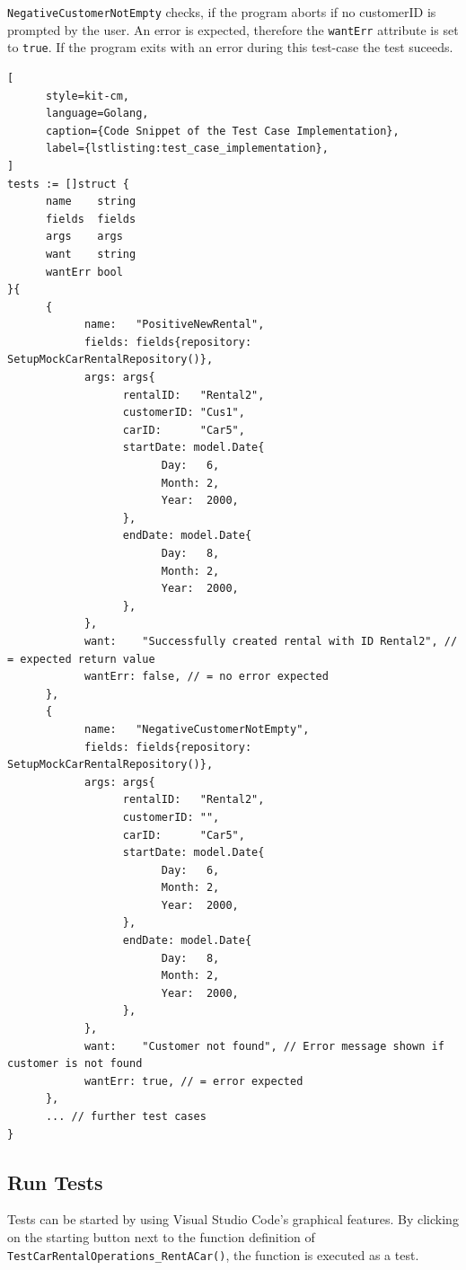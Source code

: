 \texttt{NegativeCustomerNotEmpty} checks, if the program aborts if no customerID is prompted by the user.
An error is expected, therefore the \texttt{wantErr} attribute is set to \texttt{true}.
If the program exits with an error during this test-case the test suceeds.

\begin{lstlisting}[
      style=kit-cm,
      language=Golang,
      caption={Code Snippet of the Test Case Implementation},
      label={lstlisting:test_case_implementation},
]
tests := []struct {
      name    string
      fields  fields
      args    args
      want    string
      wantErr bool
}{
      {
            name:   "PositiveNewRental",
            fields: fields{repository: SetupMockCarRentalRepository()},
            args: args{
                  rentalID:   "Rental2",
                  customerID: "Cus1",
                  carID:      "Car5",
                  startDate: model.Date{
                        Day:   6,
                        Month: 2,
                        Year:  2000,
                  },
                  endDate: model.Date{
                        Day:   8,
                        Month: 2,
                        Year:  2000,
                  },
            },
            want:    "Successfully created rental with ID Rental2", // = expected return value
            wantErr: false, // = no error expected 
      },
      {
            name:   "NegativeCustomerNotEmpty",
            fields: fields{repository: SetupMockCarRentalRepository()},
            args: args{
                  rentalID:   "Rental2",
                  customerID: "",
                  carID:      "Car5",
                  startDate: model.Date{
                        Day:   6,
                        Month: 2,
                        Year:  2000,
                  },
                  endDate: model.Date{
                        Day:   8,
                        Month: 2,
                        Year:  2000,
                  },
            },
            want:    "Customer not found", // Error message shown if customer is not found
            wantErr: true, // = error expected
      },
      ... // further test cases
}
\end{lstlisting}

\subsection*{Run Tests}
Tests can be started by using Visual Studio Code's graphical features.
By clicking on the starting button next to the function definition of \texttt{TestCarRentalOperations\_RentACar()}, the function is executed as a test.

